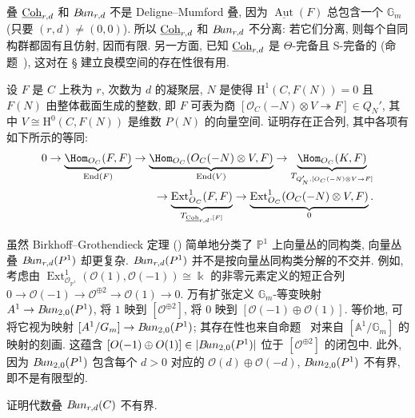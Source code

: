 叠 $\underline{\mathrm{Coh}}_{r,d}$ 和 $B\!un_{r,d}$ 不是 Deligne--Mumford 叠, 因为 $\underline{\operatorname{Aut}}(F)$ 总包含一个 $\mathbb G_m$ (只要 $(r,d)\ne(0,0)$). 所以 $\underline{\mathrm{Coh}}_{r,d}$ 和 $B\!un_{r,d}$ 不分离: 若它们分离, 则每个自同构群都固有且仿射, 因而有限. 另一方面, 已知 $\underline{\mathrm{Coh}}_{r,d}$ 是 $\Theta$-完备且 S-完备的 (命题~), 这对在 \S{} 建立良模空间的存在性很有用.
\begin{exercise}\label{src:9.2.1}
设 $F$ 是 $C$ 上秩为 $r$, 次数为 $d$ 的凝聚层, $N$ 是使得 $\mathrm H^1(C,F(N))=0$ 且 $F(N)$ 由整体截面生成的整数, 即 $F$ 可表为商 $[\mathcal O_C(-N)\otimes V\twoheadrightarrow F]\in Q_N'$, 其中 $V\cong\mathrm H^0(C,F(N))$ 是维数 $P(N)$ 的向量空间. 证明存在正合列, 其中各项有如下所示的等同:
\[
\begin{aligned}
0\to\underbrace{\Hom_{\mathcal O_C}(F,F)}_{\operatorname{End}(F)}
\to\underbrace{\Hom_{\mathcal O_C}(\mathcal O_C(-N)\otimes V,F)}_{\operatorname{End}(V)}
\to\underbrace{\Hom_{\mathcal O_C}(K,F)}_{T_{Q_N',[\mathcal O_C(-N)\otimes V\to F]}}\\
\to\underbrace{\operatorname{Ext}_{\mathcal O_C}^1(F,F)}_{T_{\Coh_{r,d},[F]}}
\to\underbrace{\operatorname{Ext}_{\mathcal O_C}^1(\mathcal O_C(-N)\otimes V,F)}_0.
\end{aligned}
\]
\end{exercise}
\begin{remark}\label{src:9.2.2}
虽然 Birkhoff--Grothendieck 定理 () 简单地分类了 $\mathbb P^1$ 上向量丛的同构类, 向量丛叠 $B\!un_{r,d}(P^1)$ 却更复杂. $B\!un_{r,d}(P^1)$ 并不是按向量丛同构类分解的不交并. 例如, 考虑由 $\operatorname{Ext}_{\mathcal O_{\mathbb P^1}}^1(\mathcal O(1),\mathcal O(-1))\cong\Bbbk$ 的非零元素定义的短正合列 $0\to\mathcal O(-1)\to\mathcal O^{\oplus2}\to\mathcal O(1)\to0$. 万有扩张定义 $\mathbb G_m$-等变映射 $A^1\to B\!un_{2,0}(P^1)$, 将 $1$ 映到 $[\mathcal O^{\oplus2}]$, 将 $0$ 映到 $[\mathcal O(-1)\oplus\mathcal O(1)]$. 等价地, 可将它视为映射 $[A^1/G_m]\to B\!un_{2,0}(P^1)$; 其存在性也来自命题~ 对来自 $[\mathbb A^1/\mathbb G_m]$ 的映射的刻画. 这蕴含 $[O(-1)\oplus O(1)]\in|B\!un_{2,0}(P^1)|$ 位于 $[\mathcal O^{\oplus2}]$ 的闭包中. 此外, 因为 $B\!un_{2,0}(P^1)$ 包含每个 $d>0$ 对应的 $\mathcal O(d)\oplus\mathcal O(-d)$, $B\!un_{2,0}(P^1)$ 不有界, 即不是有限型的.
\end{remark}
\begin{exercise}\label{src:9.2.3}
证明代数叠 $B\!un_{r,d}(C)$ 不有界.
\end{exercise}
